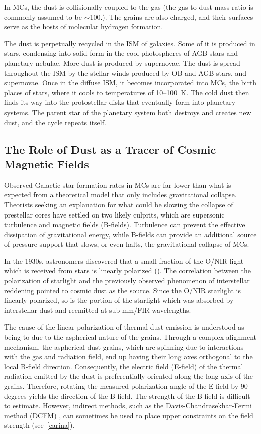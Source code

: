 In MCs, the dust is collisionally coupled to the gas (the gas-to-dust mass ratio is commonly assumed to be $\sim$100.). The grains are also charged, and their surfaces serve as the hosts of molecular hydrogen formation.

The dust is perpetually recycled in the ISM of galaxies. Some of it is produced in stars, condensing into solid form in the cool  photospheres of AGB stars and planetary nebulae. More dust is produced by supernovae. The dust is spread throughout the ISM by the stellar winds produced by OB and AGB stars, and supernovae. Once in the diffuse ISM, it becomes incorporated into MCs, the birth places of stars, where it cools to temperatures of 10--100~K. The cold dust then finds its way into the protostellar disks that eventually form into planetary systems. The parent star of the planetary system both destroys and creates new dust, and the cycle repeats itself.

\subsection{The Role of Dust as a Tracer of Cosmic Magnetic Fields}

Observed Galactic star formation rates in MCs are far lower than what is expected from a theoretical model that only includes gravitational collapse. Theorists seeking an explanation for what could be slowing the collapse of prestellar cores have settled on two likely culprits, which are supersonic turbulence and magnetic fields (B-fields). Turbulence can prevent the effective dissipation of gravitational energy, while B-fields can provide an additional source of pressure support that slows, or even halts, the gravitational collapse of MCs.

In the 1930s, astronomers discovered that a small fraction of the O/NIR light which is received from stars is linearly polarized (\citet{hall1949observations,hiltner1949polarization}). The correlation between the polarization of starlight and the previously observed phenomenon of interstellar reddening pointed to cosmic dust as the source. Since the O/NIR starlight is linearly polarized, so is the portion of the starlight which was absorbed by interstellar dust and reemitted at sub-mm/FIR wavelengths.

The cause of the linear polarization of thermal dust emission is understood as being to due to the aspherical nature of the grains. Through a complex alignment mechanism, the aspherical dust grains, which are spinning due to interactions with the gas and radiation field, end up having their long axes orthogonal to the local B-field direction. Consequently, the electric field (E-field) of the thermal radiation emitted by the dust is preferentially oriented along the long axis of the grains. Therefore, rotating the measured polarization angle of the E-field by 90 degrees yields the direction of the B-field. The strength of the B-field is difficult to estimate. However, indirect methods, such as the Davis-Chandrasekhar-Fermi method (DCFM) \citep{chandrasekhar1953magnetic}, can sometimes be used to place upper constraints on the field strength (see~\ref{carina}).

